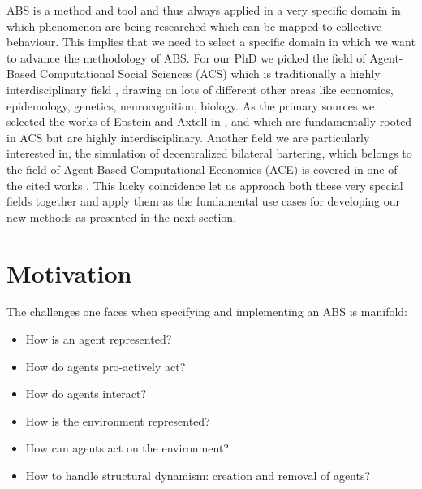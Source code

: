 ABS is a method and tool and thus always applied in a very specific domain in which phenomenon are being researched which can be mapped to collective behaviour. This implies that we need to select a specific domain in which we want to advance the methodology of ABS. For our PhD we picked the field of Agent-Based Computational Social Sciences (ACS) which is traditionally a highly interdisciplinary field \cite{axelrod_chapter_2006}, drawing on lots of different other areas like economics, epidemology, genetics, neurocognition, biology. As the primary sources we selected the works of Epstein and Axtell in \cite{epstein_growing_1996}, \cite{epstein_generative_2012} and \cite{epstein_agent_zero:_2014} which are fundamentally rooted in ACS but are highly interdisciplinary.
Another field we are particularly interested in, the simulation of decentralized bilateral bartering, which belongs to the field of Agent-Based Computational Economics (ACE) \cite{tesfatsion_agent-based_2006} is covered in one of the cited works \cite{epstein_growing_1996}. This lucky coincidence let us approach both these very special fields together and apply them as the fundamental use cases for developing our new methods as presented in the next section.

\section{Motivation}
The challenges one faces when specifying and implementing an ABS is manifold:

\begin{itemize}
	\item How is an agent represented?
	\item How do agents pro-actively act?
	\item How do agents interact?
	\item How is the environment represented?
	\item How can agents act on the environment?
	\item How to handle structural dynamism: creation and removal of agents?
\end{itemize}

